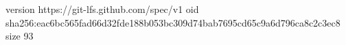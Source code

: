 version https://git-lfs.github.com/spec/v1
oid sha256:eac6bc565fad66d32fde188b053bc309d74bab7695cd65c9a6d796ca8c2c3ec8
size 93
